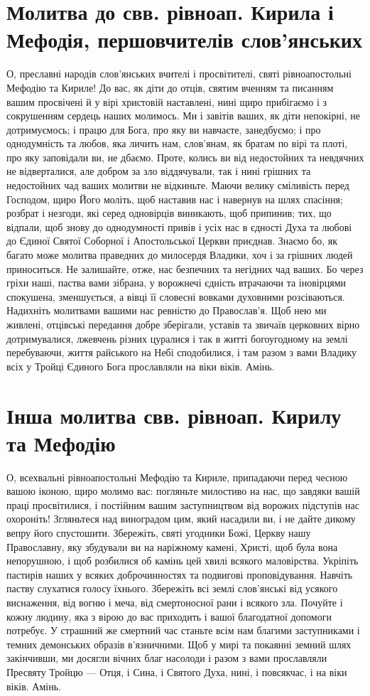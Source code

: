 \documentclass[chapters.tex]{subfiles}
\begin{document}
\section{Молитва до свв. рівноап. Кирила і Мефодія, першовчителів слов’янських}
О, преславні народів слов’янських вчителі і просвітителі, святі рівноапостольні Мефодію та Кириле! До вас, як діти до отців, святим вченням та писанням вашим просвічені й у вірі христовій наставлені, нині щиро прибігаємо і з сокрушенням сердець наших молимось. Ми і завітів ваших, як діти непокірні, не дотримуємось; і працю для Бога, про яку ви навчаєте, занедбуємо; і про однодумність та любов, яка личить нам, слов’янам, як братам по вірі та плоті, про яку заповідали ви, не дбаємо. Проте, колись ви від недостойних та невдячних не відверталися, але добром за зло віддячували, так і нині грішних та недостойних чад ваших молитви не відкиньте. Маючи велику сміливість перед Господом, щиро Його моліть, щоб наставив нас і навернув на шлях спасіння; розбрат і незгоди, які серед одновірців виникають, щоб припинив; тих, що відпали, щоб знову до однодумності привів і усіх нас в єдності Духа та любові до Єдиної Святої Соборної і Апостольської Церкви приєднав. Знаємо бо, як багато може молитва праведних до милосердя Владики, хоч і за грішних людей приноситься. Не залишайте, отже, нас безпечних та негідних чад ваших. Бо через гріхи наші, паства вами зібрана, у ворожнечі єдність втрачаючи та іновірцями спокушена, зменшується, а вівці її словесні вовками духовними розсіваються. Надихніть молитвами вашими нас ревністю до Православ’я. Щоб нею ми живлені, отцівські передання добре зберігали, уставів та звичаїв церковних вірно дотримувалися, лжевчень різних цуралися і так в житті богоугодному на землі перебуваючи, життя райського на Небі сподобилися, і там разом з вами Владику всіх у Тройці Єдиного Бога прославляли на віки віків. Амінь.

\section{Інша молитва свв. рівноап. Кирилу та Мефодію}
О, всехвальні рівноапостольні Мефодію та Кириле, припадаючи перед чесною вашою іконою, щиро молимо вас: погляньте милостиво на нас, що завдяки вашій праці просвітилися, і постійним вашим заступництвом від ворожих підступів нас охороніть! Згляньтеся над виноградом цим, який насадили ви, і не дайте дикому вепру його спустошити. Збережіть, святі угодники Божі, Церкву нашу Православну, яку збудували ви на наріжному камені, Христі, щоб була вона непорушною, і щоб розбилися об камінь цей хвилі всякого маловірства. Укріпіть пастирів наших у всяких доброчинностях та подвигові проповідування. Навчіть паству слухатися голосу їхнього. Збережіть всі землі слов’янські від усякого виснаження, від вогню і меча, від смертоносної рани і всякого зла. Почуйте і кожну людину, яка з вірою до вас приходить і вашої благодатної допомоги потребує. У страшний же смертний час станьте всім нам благими заступниками і темних демонських образів в’язничними. Щоб у мирі та покаянні земний шлях закінчивши, ми досягли вічних благ насолоди і разом з вами прославляли Пресвяту Тройцю — Отця, і Сина, і Святого Духа, нині, і повсякчас, і на віки віків. Амінь.
\end{document}
